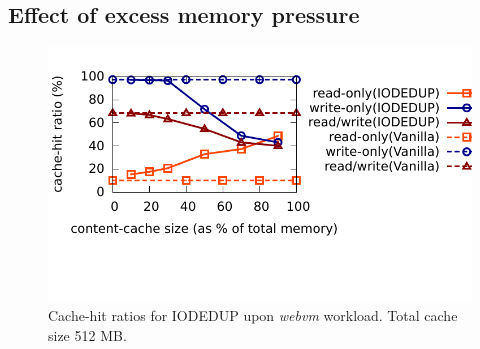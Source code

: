 \subsection{Effect of excess memory pressure}
\begin{figure}
    \centering
    \includegraphics[scale=0.80]{confided-figures/sweetspot-512MB/sweetspot-512MB.pdf}
\vspace{-0.5in}
\caption{Cache-hit ratios for IODEDUP upon \textit{webvm} workload. 
Total cache size 512 MB.}
\vspace{-0.05in}
\label{fig:sweetspot-512MB}
\end{figure}

